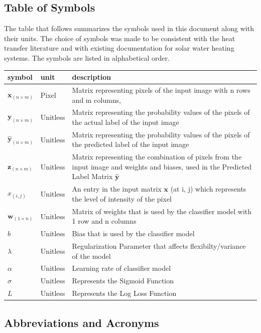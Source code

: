 \documentclass[12pt]{article}
\begin{document}
\subsection{Table of Symbols}

The table that follows summarizes the symbols used in this document along with
their units.  The choice of symbols was made to be consistent with the heat
transfer literature and with existing documentation for solar water heating
systems.  The symbols are listed in alphabetical order.

\renewcommand{\arraystretch}{1.2}
\noindent \begin{longtable*}{l l p{12cm}} \toprule
\textbf{symbol} & \textbf{unit} & \textbf{description}\\
\midrule 
$\mathbf{x}_(n \times m)$ & Pixel & Matrix representing pixels of the input image with n rows and m columns, 
\\
$\mathbf{y}_(n \times m)$ & Unitless & Matrix representing the probability values of the pixels of the actual label of the input image
\\
$\mathbf{\hat{y}}_(n \times m)$ & Unitless & Matrix representing the probability values of the pixels of the predicted label of the input image
\\
$\mathbf{z}_(n \times m)$ & Unitless & Matrix representing the combination of pixels from the input image and weights and biases, used in the Predicted Label Matrix $\mathbf{\hat{y}}$
\\
$x_(i,j)$ & Unitless & An entry in the input matrix $\mathbf{x}$ (at i, j) which represents the level of intensity of the pixel
\\
$\mathbf{w}_(1 \times n)$ & Unitless & Matrix of weights that is used by the classifier model with 1 row and n columns
\\
$b$ & Unitless & Bias that is used by the classifier model
\\
$\lambda$ & Unitless & Regularization Parameter that affects flexibilty/variance of the model
\\
$\alpha$ & Unitless & Learning rate of classifier model
\\
$\sigma$ & Unitless & Represents the Sigmoid Function
\\
$L$ & Unitless & Represents the Log Loss Function
\\
\bottomrule
\end{longtable*}

\subsection{Abbreviations and Acronyms}
\end{document}
